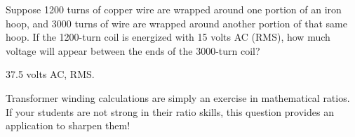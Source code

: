 

Suppose 1200 turns of copper wire are wrapped around one portion of an iron hoop, and 3000 turns of wire are wrapped around another portion of that same hoop.  If the 1200-turn coil is energized with 15 volts AC (RMS), how much voltage will appear between the ends of the 3000-turn coil?







37.5 volts AC, RMS.







Transformer winding calculations are simply an exercise in mathematical ratios.  If your students are not strong in their ratio skills, this question provides an application to sharpen them!




